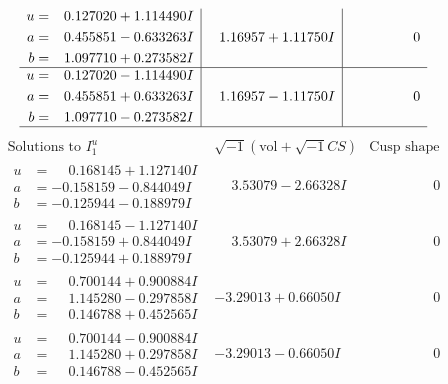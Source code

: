 \documentclass[1p]{elsarticle_modified}
\theoremstyle{definition}
\newcommand{\I}{\sqrt{-1}}
\begin{document}
$$\begin{array}{c|c|c}
\begin{aligned}
u &= \phantom{-}0.127020 + 1.114490 I \\
a &= \phantom{-}0.455851 - 0.633263 I \\
b &= \phantom{-}1.097710 + 0.273582 I\end{aligned}
 & \phantom{-}1.16957 + 1.11750 I & \phantom{-0.000000 } 0 \\ \hline\begin{aligned}
u &= \phantom{-}0.127020 - 1.114490 I \\
a &= \phantom{-}0.455851 + 0.633263 I \\
b &= \phantom{-}1.097710 - 0.273582 I\end{aligned}
 & \phantom{-}1.16957 - 1.11750 I & \phantom{-0.000000 } 0\\
 \hline 
 \end{array}$$\newpage$$\begin{array}{c|c|c}  
\text{Solutions to }I^u_{1}& \I (\text{vol} + \sqrt{-1}CS) & \text{Cusp shape}\\
 \hline 
\begin{aligned}
u &= \phantom{-}0.168145 + 1.127140 I \\
a &= -0.158159 - 0.844049 I \\
b &= -0.125944 - 0.188979 I\end{aligned}
 & \phantom{-}3.53079 - 2.66328 I & \phantom{-0.000000 } 0 \\ \hline\begin{aligned}
u &= \phantom{-}0.168145 - 1.127140 I \\
a &= -0.158159 + 0.844049 I \\
b &= -0.125944 + 0.188979 I\end{aligned}
 & \phantom{-}3.53079 + 2.66328 I & \phantom{-0.000000 } 0 \\ \hline\begin{aligned}
u &= \phantom{-}0.700144 + 0.900884 I \\
a &= \phantom{-}1.145280 - 0.297858 I \\
b &= \phantom{-}0.146788 + 0.452565 I\end{aligned}
 & -3.29013 + 0.66050 I & \phantom{-0.000000 } 0 \\ \hline\begin{aligned}
u &= \phantom{-}0.700144 - 0.900884 I \\
a &= \phantom{-}1.145280 + 0.297858 I \\
b &= \phantom{-}0.146788 - 0.452565 I\end{aligned}
 & -3.29013 - 0.66050 I & \phantom{-0.000000 } 0 \\ \hline\begin{aligned}

\end{aligned}
\end{array}$$
\end{document}
